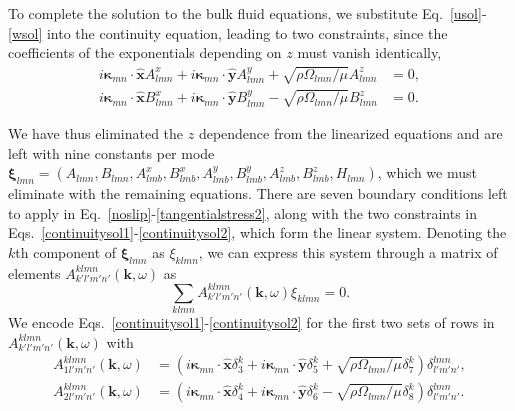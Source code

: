 \documentclass[aps,pre,amsmath,amssymb,floatfix,onecolumn,notitlepage,10pt]{revtex4-1}
\begin{document}
To complete the solution to the bulk fluid equations, we substitute Eq.~\eqref{usol}-\eqref{wsol} into the continuity equation, leading to two constraints, since the coefficients of the exponentials depending on $z$ must vanish identically,
\begin{align}
i\bm{\kappa}_{mn}\cdot\hat{\mathbf{x}}A^x_{lmn}+i\bm{\kappa}_{mn}\cdot\hat{\mathbf{y}}A^y_{lmn}+\sqrt{\rho \Omega_{lmn}/\mu}A^z_{lmn} &= 0, \label{continuitysol1} \\
i\bm{\kappa}_{mn}\cdot\hat{\mathbf{x}}B^x_{lmn}+i\bm{\kappa}_{mn}\cdot\hat{\mathbf{y}}B^y_{lmn}-\sqrt{\rho \Omega_{lmn}/\mu}B^z_{lmn} &= 0. \label{continuitysol2}
\end{align}

We have thus eliminated the $z$ dependence from the linearized equations and are left with nine constants per mode $\bm{\xi}_{lmn}=(A_{lmn}, B_{lmn}, A^x_{lmb}, B^x_{lmb},  A^y_{lmb}, B^y_{lmb},  A^z_{lmb}, B^z_{lmb}, H_{lmn})$, which we must eliminate with the remaining equations. There are seven boundary conditions left to apply in Eq.~\eqref{noslip}-\eqref{tangentialstress2}, along with the two constraints in Eqs.~\eqref{continuitysol1}-\eqref{continuitysol2}, which form the linear system.  Denoting the $k$th component of $\bm{\xi}_{lmn}$ as $\xi_{klmn}$, we can express this system through a matrix of elements $A^{klmn}_{k'l'm'n'}(\mathbf{k}, \omega)$ as
\begin{equation}
\sum_{klmn} A^{klmn}_{k'l'm'n'}(\mathbf{k}, \omega) \xi_{klmn} = 0. \label{linear}
\end{equation}
We encode Eqs.~\eqref{continuitysol1}-\eqref{continuitysol2} for the first two sets of rows in $A^{klmn}_{k'l'm'n'}(\mathbf{k}, \omega)$ with
\begin{align}
A^{klmn}_{1l'm'n'}(\mathbf{k}, \omega) &= (i\bm{\kappa}_{mn}\cdot\hat{\mathbf{x}}\delta^{k}_{3}+i\bm{\kappa}_{mn}\cdot\hat{\mathbf{y}}\delta^{k}_{5}+\sqrt{\rho \Omega_{lmn}/\mu}\delta^{k}_{7})\delta^{lmn}_{l'm'n'}, \label{lconstraint1} \\
A^{klmn}_{2l'm'n'}(\mathbf{k}, \omega) &= (i\bm{\kappa}_{mn}\cdot\hat{\mathbf{x}}\delta^{k}_{4}+i\bm{\kappa}_{mn}\cdot\hat{\mathbf{y}}\delta^{k}_{6}-\sqrt{\rho \Omega_{lmn}/\mu}\delta^{k}_{8})\delta^{lmn}_{l'm'n'}. \label{lconstraint2}
\end{align}
\end{document}
